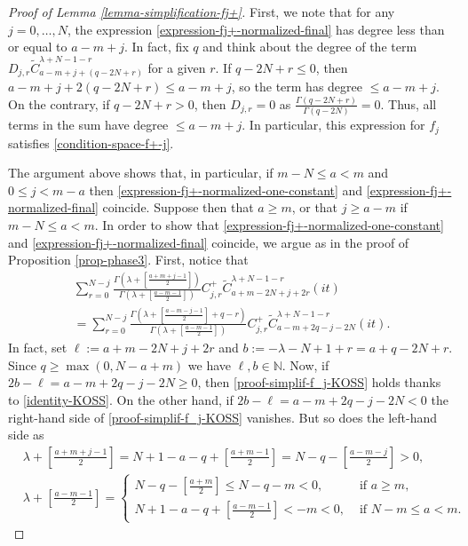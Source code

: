 \documentclass[12pt, pdflatex, a4paper]{article}
\theoremstyle{plain}
\theoremstyle{definition}
\def\Geg{\widetilde{C}}
\def\N{{\mathbb N}}
\begin{document}
\begin{proof}[Proof of Lemma \ref{lemma-simplification-fj+}]
First, we note that for any $j = 0,\ldots, N$, the expression \eqref{expression-fj+-normalized-final} has degree less than or equal to $a-m+j$. In fact, fix $q$ and think about the degree of the term $D_{j,r} \Geg_{a-m+j+(q-2N+r)}^{\lambda+N-1-r}$ for a given $r$. If $q-2N+r \leq 0$, then $a-m+j+2(q-2N+r) \leq a-m+j$, so the term has degree $\leq a-m+j$. On the contrary, if $q-2N+r > 0$, then $D_{j,r} = 0$ as $\frac{\Gamma(q-2N+r)}{\Gamma(q-2N)} = 0$. Thus, all terms in the sum have degree $\leq a-m+j$. In particular, this expression for $f_j$ satisfies \eqref{condition-space-f+-j}.

The argument above shows that, in particular, if $m-N \leq a < m$ and $0 \leq j <m-a$ then \eqref{expression-fj+-normalized-one-constant} and \eqref{expression-fj+-normalized-final} coincide. Suppose then that $a \geq m$, or that $j \geq a-m$ if $m-N \leq a < m$. In order to show that \eqref{expression-fj+-normalized-one-constant} and \eqref{expression-fj+-normalized-final} coincide, we argue as in the proof of Proposition \ref{prop-phase3}. First, notice that
\begin{multline}\label{proof-simplif-f_j-KOSS}
\sum_{r=0}^{N-j}\frac{\Gamma\left(\lambda+\left[\frac{a+m+j-1}{2}\right]\right)}{\Gamma\left(\lambda+\left[\frac{a-m-1}{2}\right]\right)}C_{j,r}^+\Geg_{a+m-2N+j+2r}^{\lambda+N-1-r}(it) \\= \sum_{r=0}^{N-j}\frac{\Gamma\left(\lambda+\left[\frac{a-m-j-1}{2}\right]+q-r\right)}{\Gamma\left(\lambda+\left[\frac{a-m-1}{2}\right]\right)}C_{j,r}^+\Geg_{a-m+2q-j-2N}^{\lambda+N-1-r}(it).
\end{multline}
In fact, set $\ell := a+m-2N+j+2r$ and $b := -\lambda-N+1+r = a+q-2N+r$. Since $q \geq \max(0, N-a+m)$ we have $\ell, b \in \N$. Now, if $2b-\ell = a-m+2q-j-2N \geq 0$, then \eqref{proof-simplif-f_j-KOSS} holds thanks to \eqref{identity-KOSS}. On the other hand, if $2b-\ell =a-m+2q-j-2N <0$ the right-hand side of \eqref{proof-simplif-f_j-KOSS} vanishes. But so does the left-hand side as
\begin{align*}
&\lambda + \left[\frac{a+m+j-1}{2}\right] = N+1-a-q + \left[\frac{a+m-1}{2}\right] = N-q - \left[\frac{a-m-j}{2}\right] > 0,\\[4pt]
&\lambda + \left[\frac{a-m-1}{2}\right] =
\begin{cases}
N-q - \left[\frac{a+m}{2}\right] \leq N-q-m < 0, &\text{ if } a \geq m,\\
N+1-a-q + \left[\frac{a-m-1}{2}\right] < -m < 0, &\text{ if } N-m \leq a < m.

\end{cases}
\end{align*}
\end{proof}
\end{document}
